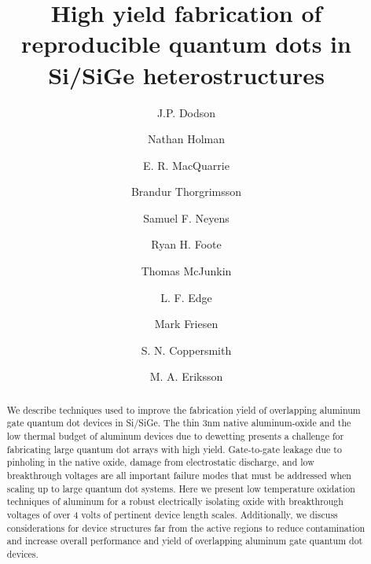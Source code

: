 \documentclass[reprint,aps,pra,superscriptaddress,notitlepage]{revtex4-1}
\begin{document}
\def\simlt{\mathrel{\lower .3ex \rlap{$\sim$}\raise .5ex \hbox{$<$}}}

\title{\textbf{\selectfont 
High yield fabrication of reproducible quantum dots in Si/SiGe heterostructures}}
\author{J.P. Dodson}
\author{Nathan Holman}
\author{E. R. MacQuarrie}
\author{Brandur Thorgrimsson}
\author{Samuel F. Neyens}
\author{Ryan H. Foote}
\author{Thomas McJunkin}
\author{L. F. Edge}
\author{Mark Friesen}
\author{S. N. Coppersmith}
\author{M. A. Eriksson}

\begin{abstract}
We describe techniques used to improve the fabrication yield of overlapping aluminum gate quantum dot devices in Si/SiGe. The thin 3nm native aluminum-oxide and the low thermal budget of aluminum devices due to dewetting presents a challenge for fabricating large quantum dot arrays with high yield. Gate-to-gate leakage due to pinholing in the native oxide, damage from electrostatic discharge, and low breakthrough voltages are all important failure modes that must be addressed when scaling up to large quantum dot systems. Here we present low temperature oxidation techniques of aluminum for a robust electrically isolating oxide with breakthrough voltages of over 4 volts of pertinent device length scales. Additionally, we discuss considerations for device structures far from the active regions to reduce contamination and increase overall performance and yield of overlapping aluminum gate quantum dot devices. 
\end{abstract}

\maketitle
\end{document}
